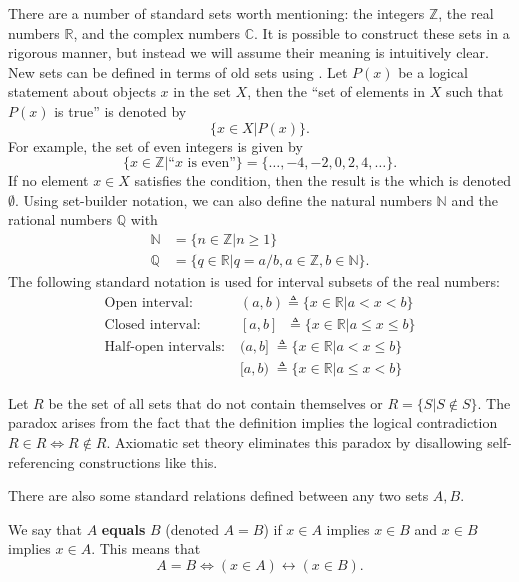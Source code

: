 There are a number of standard sets worth mentioning: the integers $\mathbb{Z}$, the real numbers $\mathbb{R}$, and the complex numbers $\mathbb{C}$.
It is possible to construct these sets in a rigorous manner, but instead we will assume their meaning is intuitively clear.
New sets can be defined in terms of old sets using .
Let $P(x)$ be a logical statement about objects $x$ in the set $X$, then the ``set of elements in $X$ such that $P(x)$ is true'' is denoted by
\[ \{ x\in X | P(x) \}. \]
For example, the set of even integers is given by
\[ \{ x\in \mathbb{Z} | \textrm{``}x\textrm{ is even''} \} = \{ \ldots,-4,-2,0,2,4,\ldots \}. \]
If no element $x\in X$ satisfies the condition, then the result is the  which is denoted $\emptyset$.
Using set-builder notation, we can also define the natural numbers $\mathbb{N}$ and the rational numbers $\mathbb{Q}$ with
\begin{align*}
\mathbb{N} & = \{ n\in \mathbb{Z} | n\geq 1 \} \\
\mathbb{Q} & = \{ q\in \mathbb{R} | q=a/b, a\in \mathbb{Z}, b\in \mathbb{N} \}.
\end{align*}
The following standard notation is used for interval subsets of the real numbers:
\begin{align*}
\textrm{Open interval:} \; &  (a,b) \triangleq \{ x\in \mathbb{R} | a<x<b \} \\
\textrm{Closed interval:} \; & [a,b] \;\;\!\! \triangleq \{ x\in \mathbb{R} | a \leq x \leq b \} \\
\textrm{Half-open intervals:} \; & (a,b] \;\! \triangleq \{ x\in \mathbb{R} | a < x \leq b \} \\
& [a,b) \;\! \triangleq \{ x\in \mathbb{R} | a \leq x < b \}
\end{align*}

\begin{example}
Let $R$ be the set of all sets that do not contain themselves or $R = \{S|S\notin S\}$.
The paradox arises from the fact that the definition implies the logical contradiction $R\in R \Leftrightarrow R\notin R$.
Axiomatic set theory eliminates this paradox by disallowing self-referencing constructions like this.
\end{example}

There are also some standard relations defined between any two sets $A,B$.
\begin{definition}
We say that $A$ \textbf{equals} $B$ (denoted $A=B$) if $x\in A$ implies $x\in B$ and $x\in B$ implies $x\in A$.
This means that
\[ A=B \Leftrightarrow (x\in A)\leftrightarrow (x\in B). \]
\end{definition}

